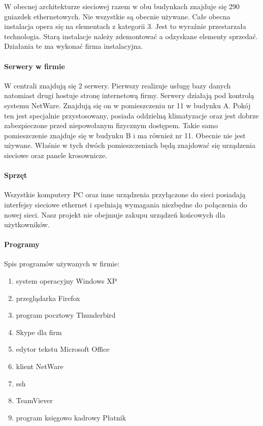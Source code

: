 \documentclass{report}
\begin{document}
W obecnej architekturze sieciowej razem w obu budynkach znajduje się 290 gniazdek ethernetowych. Nie wszystkie są obecnie używane.
Całe obecna instalacja opera się na elementach z kategorii 3. Jest to wyraźnie przestarzała technologia. Starą instalacje należy zdemontować a 
odzyskane elementy sprzedać. Działania te ma wykonać firma instalacyjna.

\paragraph{Serwery w firmie}



W centrali znajdują się 2 serwery. Pierwszy realizuje usługę
bazy danych natomiast drugi hostuje stronę internetową firmy. Serwery działają pod kontrolą systemu NetWare. Znajdują się on w
pomieszczeniu nr 11 w budynku A. Pokój ten jest specjalnie przystosowany, posiada oddzielną klimatyzacje oraz jest 
dobrze zabezpieczone przed niepowołanym fizycznym dostępem. Takie samo pomieszczenie znajduje się w budynku B i ma również nr 11. Obecnie nie jest
używane. Właśnie w tych dwóch pomieszczeniach będą znajdować się urządzenia sieciowe oraz panele krosownicze.

\paragraph{Sprzęt}


Wszystkie komputery PC oraz inne urządzenia przyłączone do sieci posiadają interfejsy sieciowe ethernet i spełniają wymagania niezbędne
do połączenia do nowej sieci. Nasz projekt nie obejmuje zakupu urządzeń końcowych dla użytkowników.

\paragraph{Programy} Spis programów używanych w firmie:
\begin{enumerate}
 \item system operacyjny Windows XP
 \item przeglądarka Firefox
 \item program pocztowy Thunderbird
 \item Skype dla firm
 \item edytor tekstu Microsoft Office
 \item klient NetWare
 \item ssh
 \item TeamViever
 \item program księgowo kadrowy Płatnik
\end{enumerate}
\end{document}

